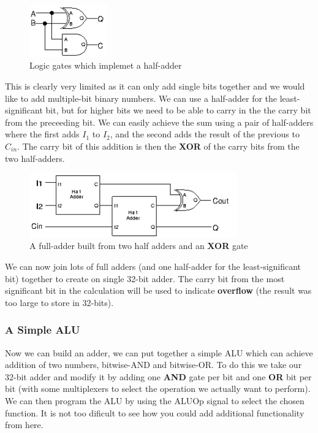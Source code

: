 \documentclass{article}
\begin{document}
	\begin{figure}[ht]
		\centering
		\includegraphics[width=0.3\textwidth]{single_bit_adder}
		\caption{Logic gates which implemet a half-adder}
		\label{fig:half adder}
	\end{figure}
	
	This is clearly very limited as it can only add single bits together and we would like to add multiple-bit binary numbers. We can use a half-adder for the least-significant bit, but for higher bits we need to be able to carry in the the carry bit from the preceeding bit. We can easily achieve the sum using a pair of half-adders where the first adds $I_{1}$ to $I_{2}$, and the second adds the result of the previous to $C_{in}$. The carry bit of this addition is then the \textbf{XOR} of the carry bits from the two half-adders.
	
	\begin{figure}[ht]
		\centering
		\includegraphics[width=0.8\textwidth]{full_adder}
		\caption{A full-adder built from two half adders and an \textbf{XOR} gate}
		\label{fig:full_adder}
	\end{figure}
	
	We can now join lots of full adders (and one half-adder for the least-significant bit) together to create on single 32-bit adder. The carry bit from the most significant bit in the calculation will be used to indicate \textbf{overflow} (the result was too large to store in 32-bits).
	
	\subsubsection{A Simple ALU}
	Now we can build an adder, we can put together a simple ALU which can achieve addition of two numbers, bitwise-AND and bitwise-OR. To do this we take our 32-bit adder and modify it by adding one \textbf{AND} gate per bit and one \textbf{OR} bit per bit (with some multiplexers to select the operation we actually want to perform). We can then program the ALU by using the ALUOp signal to select the chosen function. It is not too dificult to see how you could add additional functionality from here.
	
\end{document}
